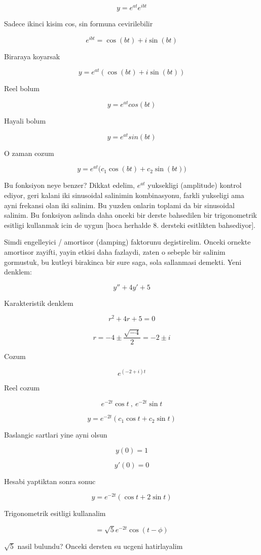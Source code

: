 \documentclass[12pt,fleqn]{article}\usepackage{../common}
\begin{document}
\[ y = e^{at} e^{ibt} \]

Sadece ikinci kisim cos, sin formuna cevirilebilir

\[ e^{ibt} = \cos(bt) + i\sin(bt) \]

Biraraya koyarsak

\[ y = e^{at} (\cos(bt) + i\sin(bt)) \]

Reel bolum

\[ y = e^{at}cos(bt) \] 

Hayali bolum

\[ y = e^{at}sin(bt) \] 

O zaman cozum

\[ y = e^{at} \bigg( c_1 \cos(bt) + c_2 \sin(bt) \bigg) \]

Bu fonksiyon neye benzer? Dikkat edelim, $e^{at}$ yuksekligi (amplitude)
kontrol ediyor, geri kalani iki sinusoidal salinimin kombinasyonu, farkli
yukseligi ama ayni frekansi olan iki salinim. Bu yuzden onlarin toplami da
bir sinusoidal salinim. Bu fonksiyon aslinda daha onceki bir derste
bahsedilen bir trigonometrik esitligi kullanmak icin de uygun [hoca
herhalde 8. dersteki esitlikten bahsediyor].

Simdi engelleyici / amortisor (damping) faktorunu degistirelim. Onceki
ornekte amortisor zayifti, yayin etkisi daha fazlaydi, zaten o sebeple bir
salinim gormustuk, bu kutleyi birakinca bir sure saga, sola sallanmasi
demekti. Yeni denklem:

\[ y'' + 4y' + 5 \]

Karakteristik denklem

\[ r^2 + 4r + 5 = 0 \]

\[ r = -4 \pm \frac{\sqrt{-4}}{2} = -2 \pm i\]

Cozum

\[ e^{(-2+i)t} \]

Reel cozum

\[ e^{-2t}\cos t \ , \ e^{-2t}\sin t\]

\[ y = e^{-2t} (c_1 \cos t + c_2 \sin t) \]

Baslangic sartlari yine ayni olsun

\[ y(0) = 1 \]

\[ y'(0) = 0 \]

Hesabi yaptiktan sonra sonuc

\[ y = e^{-2t} (\cos t + 2 \sin t) \]

Trigonometrik esitligi kullanalim

\[ = \sqrt{5}e^{-2t} \cos (t - \phi) \]

$\sqrt{5}$ nasil bulundu? Onceki dersten su ucgeni hatirlayalim
\end{document}
